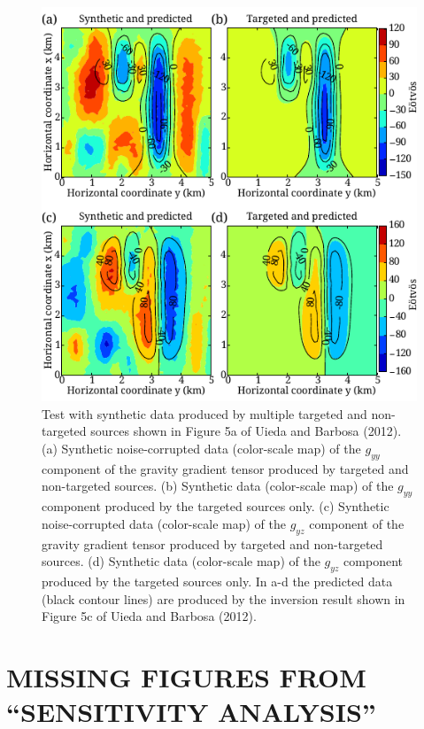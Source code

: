 \documentclass[twocolumn]{article}
\begin{document}
\begin{figure}[]
    \includegraphics{fig/synthetic-fit-gyy-gyz}
    \caption{  
    Test with synthetic data 
    produced by multiple targeted and non-targeted sources
    shown in Figure 5a of Uieda and Barbosa (2012).
    (a) Synthetic noise-corrupted data (color-scale map)
    of the $g_{yy}$ component of the gravity gradient tensor
    produced by targeted and non-targeted sources. 
    (b) Synthetic data (color-scale map)
    of the $g_{yy}$ component
    produced by the targeted sources only.
    (c) Synthetic noise-corrupted data (color-scale map)
    of the $g_{yz}$ component of the gravity gradient tensor
    produced by targeted and non-targeted sources. 
    (d) Synthetic data (color-scale map)
    of the $g_{yz}$ component
    produced by the targeted sources only.
    In a-d the predicted data (black contour lines) are
    produced by the inversion result
    shown in Figure 5c of Uieda and Barbosa (2012).
    \label{fig:synth-fit}}
\end{figure}

\vspace{-0.7cm}
\section*{\normalsize\center MISSING FIGURES FROM ``SENSITIVITY ANALYSIS''}
\end{document}
